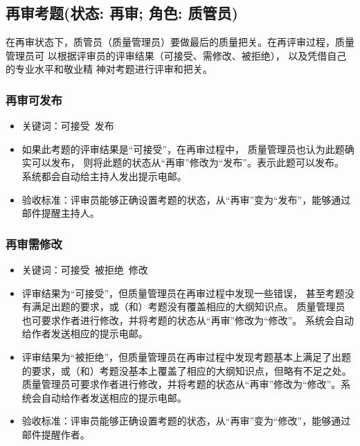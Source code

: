 \documentclass[hyperref, a4paper]{ctexart}
\providecommand{\tightlist}{%
  \setlength{\itemsep}{0pt}\setlength{\parskip}{0pt}}
\begin{document}
\hypertarget{ux518dux5ba1ux8003ux9898ux72b6ux6001-ux518dux5ba1-ux89d2ux8272-ux8d28ux7ba1ux5458}{%
\subsection{再审考题(状态: 再审; 角色:
质管员)}\label{ux518dux5ba1ux8003ux9898ux72b6ux6001-ux518dux5ba1-ux89d2ux8272-ux8d28ux7ba1ux5458}}

在再审状态下，质管员（质量管理员）要做最后的质量把关。在再评审过程，质量管理员可
以根据评审员的评审结果（可接受、需修改、被拒绝），
以及凭借自己的专业水平和敬业精 神对考题进行评审和把关。

\hypertarget{ux518dux5ba1ux53efux53d1ux5e03}{%
\subsubsection{再审可发布}\label{ux518dux5ba1ux53efux53d1ux5e03}}

\begin{itemize}
\tightlist
\item
  关键词：可接受~发布
\item
  如果此考题的评审结果是``可接受''，在再审过程中，
  质量管理员也认为此题确实可以发布，
  则将此题的状态从``再审''修改为``发布''。表示此题可以发布。
  系统都会自动给主持人发出提示电邮。
\item
  验收标准：评审员能够正确设置考题的状态，从``再审''变为``发布''，能够通过邮件提醒主持人。
\end{itemize}

\hypertarget{ux518dux5ba1ux9700ux4feeux6539}{%
\subsubsection{再审需修改}\label{ux518dux5ba1ux9700ux4feeux6539}}

\begin{itemize}
\tightlist
\item
  关键词：可接受~被拒绝~修改
\item
  评审结果为``可接受''，但质量管理员在再审过程中发现一些错误，
  甚至考题没有满足出题的要求，或（和）考题没有覆盖相应的大纲知识点。
  质量管理员也可要求作者进行修改，并将考题的状态从``再审''修改为``修改''。
  系统会自动给作者发送相应的提示电邮。
\item
  评审结果为``被拒绝''，但质量管理员在再审过程中发现考题基本上满足了出题的要求，或（和）考题没基本上覆盖了相应的大纲知识点，但略有不足之处。质量管理员可要求作者进行修改，并将考题的状态从``再审''修改为``修改''。系统会自动给作者发送相应的提示电邮。
\item
  验收标准：评审员能够正确设置考题的状态，从``再审''变为``修改''，能够通过邮件提醒作者。
\end{itemize}
\end{document}
